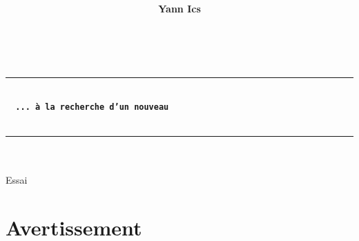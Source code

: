 \documentclass{article}
\title{%
}
\author{\textsf{\textbf{Yann Ics}}}
\date{}
\renewcommand{\contentsname}{Contents~\hfill\textbf{Line}}
\newcommand{\myulineyellow}[1]{%
  \uline{\phantom{#1}}%
  \llap{\contour{yellow!10}{#1}}%
}
\begin{document}

\makeatletter
  \begin{titlepage}
  \centering
  {\Large \@author} \\
  \rule{\linewidth}{.5pt}
  \vspace{4cm}
  
  {\LARGE \textbf{\@title}} \\
   \vspace{6 mm}
   {\color{brown} {\Large \textbf{\texttt{\, ... à la recherche d'un nouveau}}}}\\
   \vspace{2mm}
   {}\\
  \vfill
  \rule{\linewidth}{.5pt}
     {\Large \textsf{\textsl{}}}\\ 
          {\Large \textsf{\textsl{}}}\\ 

      {\Large \textsf{Essai}}\\

 \end{titlepage}
\makeatother
\renewcommand{\contentsname}{Sommaire\\}

{\color{DarkRed}\tableofcontents
\noindent\hrulefill}

\pagecolor{white}



\renewcommand\thelinenumber{\color{purple}\arabic{linenumber}}
\linenumbers
  
\section{Avertissement}
\end{document}
